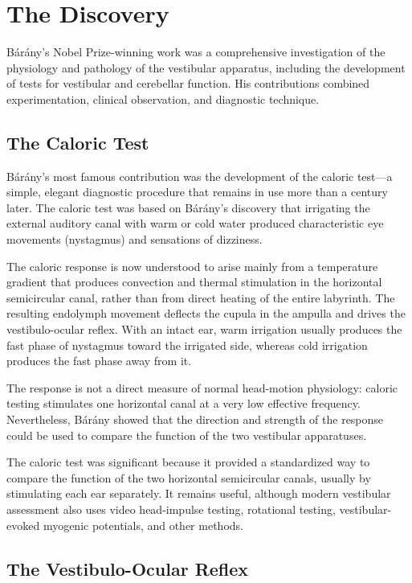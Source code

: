 \section{The Discovery}

B\'ar\'any's Nobel Prize-winning work was a comprehensive investigation of the physiology and pathology of the vestibular apparatus, including the development of tests for vestibular and cerebellar function. His contributions combined experimentation, clinical observation, and diagnostic technique.\cite{barany-lecture}

\subsection{The Caloric Test}

B\'ar\'any's most famous contribution was the development of the caloric test---a simple, elegant diagnostic procedure that remains in use more than a century later. The caloric test was based on B\'ar\'any's discovery that irrigating the external auditory canal with warm or cold water produced characteristic eye movements (nystagmus) and sensations of dizziness.

The caloric response is now understood to arise mainly from a temperature gradient that produces convection and thermal stimulation in the horizontal semicircular canal, rather than from direct heating of the entire labyrinth. The resulting endolymph movement deflects the cupula in the ampulla and drives the vestibulo-ocular reflex. With an intact ear, warm irrigation usually produces the fast phase of nystagmus toward the irrigated side, whereas cold irrigation produces the fast phase away from it.\cite{barany-caloric}

The response is not a direct measure of normal head-motion physiology: caloric testing stimulates one horizontal canal at a very low effective frequency. Nevertheless, B\'ar\'any showed that the direction and strength of the response could be used to compare the function of the two vestibular apparatuses.\cite{barany-caloric}

The caloric test was significant because it provided a standardized way to compare the function of the two horizontal semicircular canals, usually by stimulating each ear separately. It remains useful, although modern vestibular assessment also uses video head-impulse testing, rotational testing, vestibular-evoked myogenic potentials, and other methods.

\subsection{The Vestibulo-Ocular Reflex}

